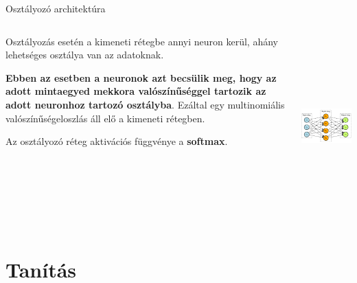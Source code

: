 \documentclass[english, aspectratio=169]{beamer}
\makeatletter
\let\origtableofcontents=\tableofcontents
\def\tableofcontents{\@ifnextchar[{\origtableofcontents}{\gobbletableofcontents}}
\def\gobbletableofcontents#1{\origtableofcontents}
\makeatother
\begin{document}
\begin{frame}{Osztályozó architektúra}
\begin{columns}
\begin{column}{.5\textwidth}
Osztályozás esetén a kimeneti rétegbe annyi neuron kerül, ahány lehetséges osztálya van az adatoknak.\par\smallskip
\textbf{Ebben az esetben a neuronok azt becsülik meg, hogy az adott mintaegyed mekkora valószínűséggel tartozik az adott neuronhoz tartozó osztályba}. Ezáltal egy multinomiális valószínűségeloszlás áll elő a kimeneti rétegben.\par\smallskip
Az osztályozó réteg aktivációs függvénye a \textbf{softmax}.
\end{column}
\begin{column}{.5\textwidth}
\begin{center}
\includegraphics[width=7cm, height=7cm, keepaspectratio]{graphs/neural_9.png}
\end{center}
\end{column}
\end{columns}
\end{frame}

\section{Tanítás}

\begin{frame}
\tableofcontents[currentsection]
\end{frame}
\end{document}
